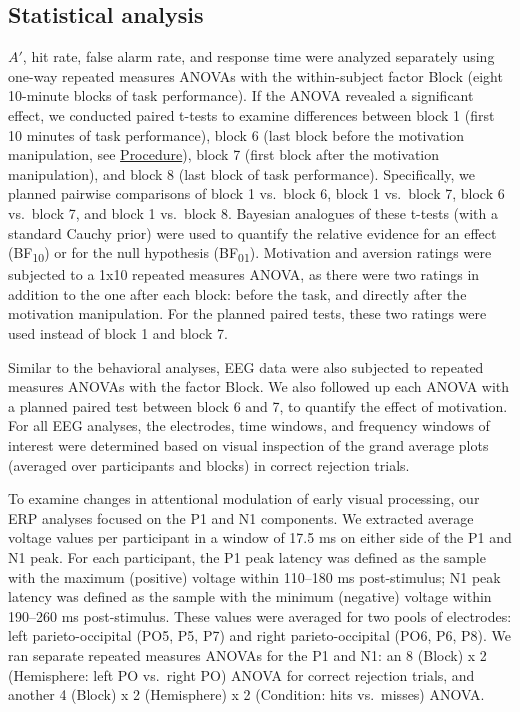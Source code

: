 \documentclass[11pt,]{memoir}
\begin{document}
\hypertarget{statistical-analysis}{%
\subsection{Statistical analysis}\label{statistical-analysis}}

\(A'\), hit rate, false alarm rate, and response time were analyzed separately using one-way repeated measures ANOVAs with the within-subject factor Block (eight 10-minute blocks of task performance). If the ANOVA revealed a significant effect, we conducted paired t-tests to examine differences between block 1 (first 10 minutes of task performance), block 6 (last block before the motivation manipulation, see \protect\hyperlink{procedure-1}{Procedure}), block 7 (first block after the motivation manipulation), and block 8 (last block of task performance). Specifically, we planned pairwise comparisons of block 1 vs.~block 6, block 1 vs.~block 7, block 6 vs.~block 7, and block 1 vs.~block 8. Bayesian analogues of these t-tests (with a standard Cauchy prior) \autocite{Rouder2009} were used to quantify the relative evidence for an effect (BF\textsubscript{10}) or for the null hypothesis (BF\textsubscript{01}). Motivation and aversion ratings were subjected to a 1x10 repeated measures ANOVA, as there were two ratings in addition to the one after each block: before the task, and directly after the motivation manipulation. For the planned paired tests, these two ratings were used instead of block 1 and block 7.

Similar to the behavioral analyses, EEG data were also subjected to repeated measures ANOVAs with the factor Block. We also followed up each ANOVA with a planned paired test between block 6 and 7, to quantify the effect of motivation. For all EEG analyses, the electrodes, time windows, and frequency windows of interest were determined based on visual inspection of the grand average plots (averaged over participants and blocks) in correct rejection trials.

To examine changes in attentional modulation of early visual processing, our ERP analyses focused on the P1 and N1 components. We extracted average voltage values per participant in a window of 17.5 ms on either side of the P1 and N1 peak. For each participant, the P1 peak latency was defined as the sample with the maximum (positive) voltage within 110--180 ms post-stimulus; N1 peak latency was defined as the sample with the minimum (negative) voltage within 190--260 ms post-stimulus. These values were averaged for two pools of electrodes: left parieto-occipital (PO5, P5, P7) and right parieto-occipital (PO6, P6, P8). We ran separate repeated measures ANOVAs for the P1 and N1: an 8 (Block) x 2 (Hemisphere: left PO vs.~right PO) ANOVA for correct rejection trials, and another 4 (Block) x 2 (Hemisphere) x 2 (Condition: hits vs.~misses) ANOVA.
\end{document}
